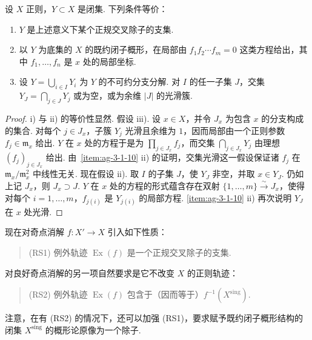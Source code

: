 \begin{lemma}\label{item:ag-4-1-3}
设 $X$ 正则，$Y\subset X$ 是闭集. 下列条件等价：
\begin{enumerate}[label=\roman*)]
\item $Y$ 是上述意义下某个正规交叉除子的支集.
\item 以 $Y$ 为底集的 $X$ 的既约闭子概形，在局部由 $f_1f_2\cdots f_m=0$ 这类方程给出，其中 $f_1,\ldots,f_n$ 是 $x$ 处的局部坐标.
\item 设 $Y=\bigcup_{i\in I}Y_i$ 为 $Y$ 的不可约分支分解. 对 $I$ 的任一子集 $J$，交集 $Y_J=\bigcap_{j\in J}Y_j$ 或为空，或为余维 $|J|$ 的光滑簇.
\end{enumerate}
\end{lemma}
\begin{proof}
i) 与 ii) 的等价性显然. 假设 iii). 设 $x\in X$，并令 $J_x$ 为包含 $x$ 的分支构成的集合. 对每个 $j\in J_x$，子簇 $Y_j$ 光滑且余维为 $1$，因而局部由一个正则参数 $f_j\in\mathfrak m_x$ 给出. $Y$ 在 $x$ 处的方程于是为 $\prod_{j\in J_x}f_j$，而交集 $\bigcap_{j\in J_x}Y_j$ 由理想 $(f_j)_{j\in J_x}$ 给出. 由~\ref{item:ag-3-1-10} ii) 的证明，交集光滑这一假设保证诸 $f_j$ 在 $\mathfrak m_x/\mathfrak m_x^2$ 中线性无关. 现在假设 ii). 取 $I$ 的子集 $J$，使 $Y_J$ 非空，并取 $x\in Y_J$. 仍如上记 $J_x$，则 $J_x\supset J$. $Y$ 在 $x$ 处的方程的形式蕴含存在双射 $\{1,\ldots,m\}\xrightarrow\sim J_x$，使得对每个 $i=1,\ldots,m$，$f_{j(i)}$ 是 $Y_{j(i)}$ 的局部方程. \ref{item:ag-3-1-10} ii) 再次说明 $Y_J$ 在 $x$ 处光滑.
\end{proof}
现在对奇点消解 $f:X'\longrightarrow X$ 引入如下性质：
\begin{quote}
\textup{(RS1)} 例外轨迹 $\operatorname{Ex}(f)$ 是一个正规交叉除子的支集.
\end{quote}
对良好奇点消解的另一项自然要求是它不改变 $X$ 的正则轨迹：
\begin{quote}
\textup{(RS2)} 例外轨迹 $\operatorname{Ex}(f)$ 包含于（因而等于）$f^{-1}(X^{\mathrm{sing}})$.
\end{quote}
注意，在有 (RS2) 的情况下，还可以加强 (RS1)，要求赋予既约闭子概形结构的闭集 $X^{\mathrm{sing}}$ 的概形论原像为一个除子.
